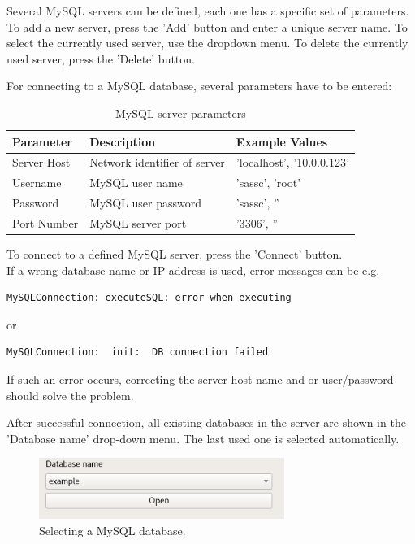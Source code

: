 \documentclass[10pt,letterpaper,extrafontsizes]{memoir}
\begin{document}
Several MySQL servers can be defined, each one has a specific set of parameters. To add a new server, press the 'Add' button and enter a unique server name. To select the currently used server, use the dropdown menu. To delete the currently used server, press the 'Delete' button.

For connecting to a MySQL database, several parameters have to be entered:

\begin{table}[H]
  \center
  \begin{tabular}{ | l | l | l |}
    \hline
    \textbf{Parameter} & \textbf{Description} & \textbf{Example Values} \\ \hline
    Server Host & Network identifier of server & 'localhost', '10.0.0.123' \\ \hline
    Username & MySQL user name & 'sassc', 'root' \\ \hline
    Password & MySQL user password & 'sassc', '' \\ \hline
    Port Number & MySQL server port & '3306', '' \\
    \hline
  \end{tabular}
  \caption{MySQL server parameters}
\end{table}

To connect to a defined MySQL server, press the 'Connect' button.\\

If  a  wrong  database  name  or  IP  address  is  used,  error  messages  can  be  e.g.  \\

\begin{verbatim}
MySQLConnection: executeSQL: error when executing
\end{verbatim}
 or 
\begin{verbatim}
MySQLConnection:  init:  DB connection failed
\end{verbatim} 

If such an error occurs, correcting the server host name and or user/password should solve the problem.

After successful connection, all existing databases in the server are shown in the 'Database name' drop-down menu. The last used one is selected automatically.

\begin{figure}[H]
  \center
    \includegraphics[width=8cm]{../screenshots/mysql_database_selection.png}
  \caption{Selecting a MySQL database.}
  \label{fig:mysql_db_select}
\end{figure}
\end{document}
